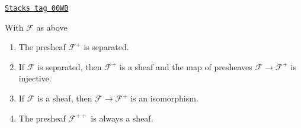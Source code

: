 \begin{theorem}[Plus]
\label{sites-theorem-plus}
\href{https://stacks.math.columbia.edu/tag/00WB}{\texttt{Stacks tag 00WB}}

With $\mathcal{F}$ as above
\begin{enumerate}
\item
\label{sites-item-sep}
The presheaf $\mathcal{F}^+$ is separated.
\item
\label{sites-item-sheaf}
If $\mathcal{F}$ is separated, then $\mathcal{F}^+$ is a sheaf
and the map of presheaves $\mathcal{F} \to \mathcal{F}^+$ is injective.
\item
\label{sites-item-plus-iso}
If $\mathcal{F}$ is a sheaf, then $\mathcal{F} \to \mathcal{F}^+$
is an isomorphism.
\item
\label{sites-item-plusplus}
The presheaf $\mathcal{F}^{++}$ is always a sheaf.
\end{enumerate}
\end{theorem}


